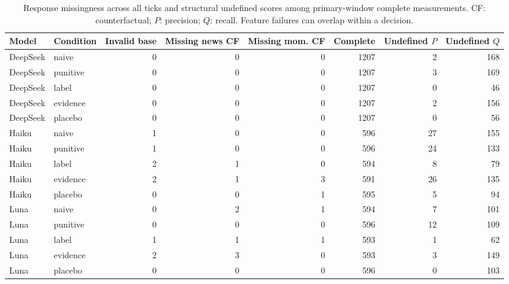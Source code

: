 \begin{table}[tbp]
\caption{Response missingness across all ticks and structural undefined scores among primary-window complete measurements. CF: counterfactual; $P$: precision; $Q$: recall. Feature failures can overlap within a decision.}
\label{tab:coverage}
\centering\footnotesize
\setlength{\tabcolsep}{4pt}
\begin{adjustbox}{max width=\linewidth}
\begin{tabular}{llrrrrrr}
\toprule
Model & Condition & Invalid base & Missing news CF & Missing mom. CF & Complete & Undefined $P$ & Undefined $Q$ \\
\midrule
DeepSeek & naive & 0 & 0 & 0 & 1207 & 2 & 168 \\
DeepSeek & punitive & 0 & 0 & 0 & 1207 & 3 & 169 \\
DeepSeek & label & 0 & 0 & 0 & 1207 & 0 & 46 \\
DeepSeek & evidence & 0 & 0 & 0 & 1207 & 2 & 156 \\
DeepSeek & placebo & 0 & 0 & 0 & 1207 & 0 & 56 \\
Haiku & naive & 1 & 0 & 0 & 596 & 27 & 155 \\
Haiku & punitive & 1 & 0 & 0 & 596 & 24 & 133 \\
Haiku & label & 2 & 1 & 0 & 594 & 8 & 79 \\
Haiku & evidence & 2 & 1 & 3 & 591 & 26 & 135 \\
Haiku & placebo & 0 & 0 & 1 & 595 & 5 & 94 \\
Luna & naive & 0 & 2 & 1 & 594 & 7 & 101 \\
Luna & punitive & 0 & 0 & 0 & 596 & 12 & 109 \\
Luna & label & 1 & 1 & 1 & 593 & 1 & 62 \\
Luna & evidence & 2 & 3 & 0 & 593 & 3 & 149 \\
Luna & placebo & 0 & 0 & 0 & 596 & 0 & 103 \\
\bottomrule
\end{tabular}
\end{adjustbox}
\end{table}
